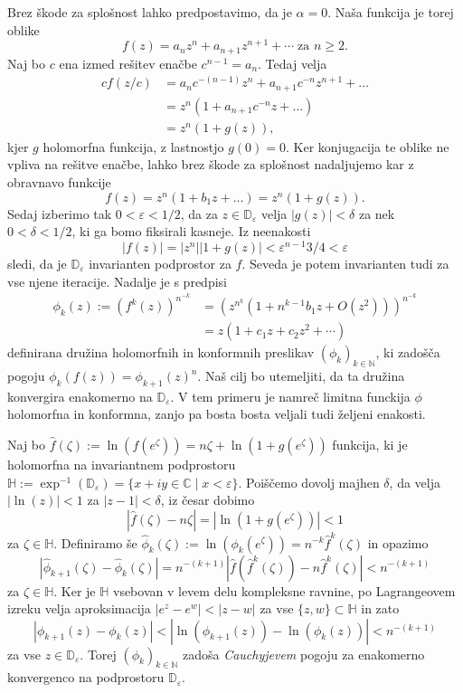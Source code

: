 \documentclass[12pt,a4paper]{amsart}
\theoremstyle{definition} %
\theoremstyle{plain} %
\newcommand{\N}{\mathbb N}
\newcommand{\CC}{\mathbb C}
\newcommand{\D}{\mathbb D} %
\newcommand{\HH}{\mathbb H} %
\begin{document}
\proof
Brez škode za splošnost lahko predpostavimo, da je $\alpha = 0$. Naša funkcija je torej oblike
$$f(z) = a_nz^n + a_{n+1}z^{n+1} + \cdots \; \text{za } n \geq 2.$$ 
Naj bo $c$ ena izmed rešitev enačbe $c^{n-1}=a_n$. Tedaj velja
\begin{equation*}
\begin{aligned}
cf(z/c) &= a_nc^{-(n-1)}z^n + a_{n+1}c^{-n}z^{n+1} + \dots  \\
&= z^n (1 + a_{n+1}c^{-n}z + \dots) \\
&= z^n (1 + g(z)),
\end{aligned}
\end{equation*}
kjer $g$ holomorfna funkcija, z lastnostjo $g(0) = 0$. 
Ker konjugacija te oblike ne vpliva na rešitve enačbe,
lahko brez škode za splošnost nadaljujemo kar z obravnavo funkcije
$$f(z) = z^n(1 + b_1z + \dots) = z^n(1 + g(z)).$$ 
Sedaj izberimo tak $0 < \varepsilon < 1/2$, 
da za $z \in \D_\varepsilon$ velja $|g(z)|  < \delta$ za nek $0 < \delta < 1/2$, ki ga bomo fiksirali kasneje. 
Iz neenakosti
$$|f(z)| = |z^n||1 + g(z)| < \varepsilon^{n-1} 3/4 < \varepsilon$$
sledi, da je $\D_\varepsilon$ invarianten podprostor za $f$. Seveda je potem invarianten tudi za vse njene iteracije.
Nadalje je s predpisi
\begin{equation*}
\begin{aligned}
\phi_k(z) := (f^k(z))^{n^{-k}} &= (z^{n^k} (1 + n^{k-1}b_1 z + O(z^2)))^{n^{-k}} \\
&= z (1 + c_1z + c_2z^2 + \cdots)
\end{aligned}
\end{equation*}
definirana družina holomorfnih in konformnih preslikav $(\phi_k)_{k\in\N}$, 
ki zadošča  pogoju $\phi_k(f(z)) = \phi_{k+1}(z)^n$.
Naš cilj bo utemeljiti, da ta družina konvergira enakomerno na $\D_\varepsilon$.
V tem primeru je namreč  limitna funckija $\phi$ holomorfna in konformna, zanjo pa bosta bosta veljali tudi željeni enakosti.

Naj bo $\hat{f}(\zeta) := \ln(f(e^\zeta)) =  n\zeta + \ln(1 + g(e^\zeta))$ funkcija, ki je holomorfna na invariantnem podprostoru
$\HH := \exp^{-1}(\D_\varepsilon) = \{x + iy \in \CC \mid x < \varepsilon\}$.
Poiščemo dovolj majhen $\delta$, da velja $|\ln(z)| < 1$ za $|z - 1| < \delta$, iz česar dobimo
$$|\hat{f}(\zeta) - n\zeta| = |\ln(1 + g(e^\zeta))| < 1$$ za $\zeta \in \HH$.
Definiramo še $\hat{\phi}_k(\zeta) := \ln(\phi_k(e^\zeta)) = n^{-k} \hat{f}^k(\zeta)$ in opazimo
$$|\hat{\phi}_{k+1}(\zeta) - \hat{\phi}_k(\zeta)| = n^{-(k+1)}|\hat{f}(\hat{f}^k(\zeta)) - n \hat{f}^k(\zeta)| < n^{-(k+1)}$$
za $\zeta \in\HH$. Ker je $\HH$ vsebovan v levem delu kompleksne ravnine, po Lagrangeovem izreku velja aproksimacija
$|e^z - e^w| < |z - w|$ za vse $\{z, w\} \subset \HH$ in zato
$$|\phi_{k+1}(z) - \phi_k(z)| < |\ln(\phi_{k+1}(z)) - \ln(\phi_k(z))| < n^{-(k+1)}$$ za vse $z \in \D_\varepsilon$.
Torej $(\phi_k)_{k\in\N}$ zadoša {\em Cauchyjevem} pogoju za enakomerno konvergenco na podprostoru $\D_\varepsilon$.
\endproof
\end{document}
